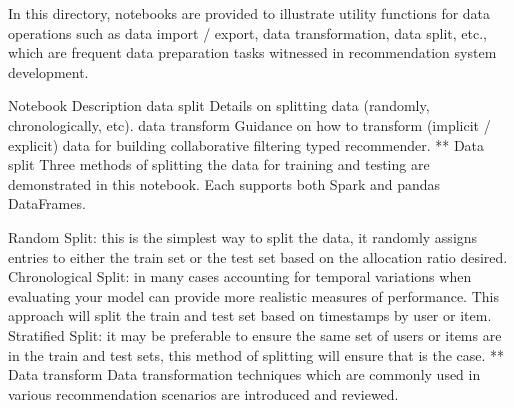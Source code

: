 In this directory, notebooks are provided to illustrate utility functions for data operations such as data import / export, data transformation, data split, etc., which are frequent data preparation tasks witnessed in recommendation system development.

Notebook	Description
data split	Details on splitting data (randomly, chronologically, etc).
data transform	Guidance on how to transform (implicit / explicit) data for building collaborative filtering typed recommender.
** Data split Three methods of splitting the data for training and testing are demonstrated in this notebook. Each supports both Spark and pandas DataFrames.

Random Split: this is the simplest way to split the data, it randomly assigns entries to either the train set or the test set based on the allocation ratio desired.
Chronological Split: in many cases accounting for temporal variations when evaluating your model can provide more realistic measures of performance. This approach will split the train and test set based on timestamps by user or item.
Stratified Split: it may be preferable to ensure the same set of users or items are in the train and test sets, this method of splitting will ensure that is the case.
** Data transform Data transformation techniques which are commonly used in various recommendation scenarios are introduced and reviewed.
